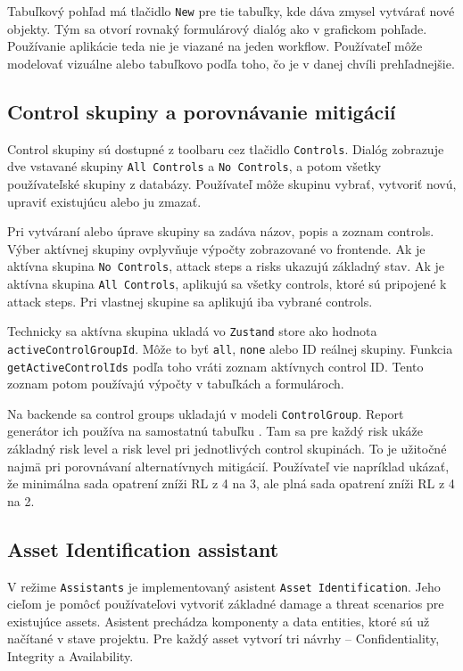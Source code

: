 \documentclass[11pt]{article}
\begin{document}
Tabuľkový pohľad má tlačidlo \texttt{New} pre tie tabuľky, kde dáva zmysel vytvárať nové objekty. Tým sa otvorí rovnaký formulárový dialóg ako v grafickom pohľade. Používanie aplikácie teda nie je viazané na jeden workflow. Používateľ môže modelovať vizuálne alebo tabuľkovo podľa toho, čo je v danej chvíli prehľadnejšie.

\subsection{Control skupiny a porovnávanie mitigácií}

Control skupiny sú dostupné z toolbaru cez tlačidlo \texttt{Controls}. Dialóg zobrazuje dve vstavané skupiny \texttt{All Controls} a \texttt{No Controls}, a potom všetky používateľské skupiny z databázy. Používateľ môže skupinu vybrať, vytvoriť novú, upraviť existujúcu alebo ju zmazať.

Pri vytváraní alebo úprave skupiny sa zadáva názov, popis a zoznam controls. Výber aktívnej skupiny ovplyvňuje výpočty zobrazované vo frontende. Ak je aktívna skupina \texttt{No Controls}, attack steps a risks ukazujú základný stav. Ak je aktívna skupina \texttt{All Controls}, aplikujú sa všetky controls, ktoré sú pripojené k attack steps. Pri vlastnej skupine sa aplikujú iba vybrané controls.

Technicky sa aktívna skupina ukladá vo \texttt{Zustand} store ako hodnota \texttt{activeControlGroupId}. Môže to byť \texttt{all}, \texttt{none} alebo ID reálnej skupiny. Funkcia \texttt{getActiveControlIds} podľa toho vráti zoznam aktívnych control ID. Tento zoznam potom používajú výpočty v tabuľkách a formulároch.

Na backende sa control groups ukladajú v modeli \texttt{ControlGroup}. Report generátor ich používa na samostatnú tabuľku . Tam sa pre každý risk ukáže základný risk level a risk level pri jednotlivých control skupinách. To je užitočné najmä pri porovnávaní alternatívnych mitigácií. Používateľ vie napríklad ukázať, že minimálna sada opatrení zníži RL z 4 na 3, ale plná sada opatrení zníži RL z 4 na 2.

\subsection{Asset Identification assistant}

V režime \texttt{Assistants} je implementovaný asistent \texttt{Asset Identification}. Jeho cieľom je pomôcť používateľovi vytvoriť základné damage a threat scenarios pre existujúce assets. Asistent prechádza komponenty a data entities, ktoré sú už načítané v stave projektu. Pre každý asset vytvorí tri návrhy -- Confidentiality, Integrity a Availability.
\end{document}
